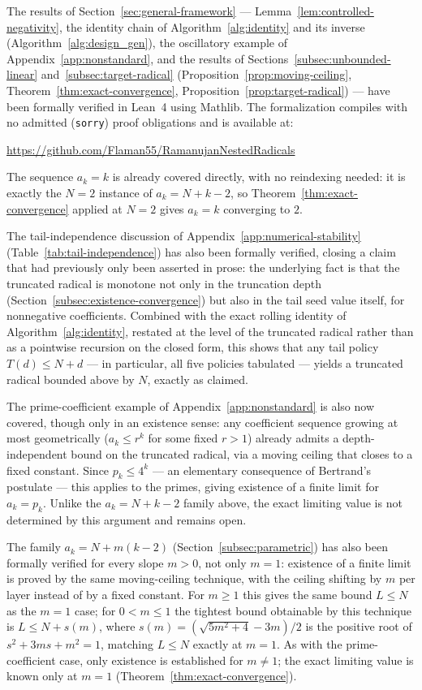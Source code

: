 \documentclass[11pt,a4paper]{amsart}
\theoremstyle{plain}
\theoremstyle{definition}
\theoremstyle{remark}
\begin{document}
The results of Section~\ref{sec:general-framework} — Lemma~\ref{lem:controlled-negativity}, the identity chain of Algorithm~\ref{alg:identity} and its inverse (Algorithm~\ref{alg:design_gen}), the oscillatory example of Appendix~\ref{app:nonstandard}, and the results of Sections~\ref{subsec:unbounded-linear} and~\ref{subsec:target-radical} (Proposition~\ref{prop:moving-ceiling}, Theorem~\ref{thm:exact-convergence}, Proposition~\ref{prop:target-radical}) — have been formally verified in Lean~4 using Mathlib. The formalization compiles with no admitted (\texttt{sorry}) proof obligations and is available at:
\begin{center}
\url{https://github.com/Flaman55/RamanujanNestedRadicals}
\end{center}
The sequence $a_k=k$ is already covered directly, with no reindexing needed: it is exactly the $N=2$ instance of $a_k=N+k-2$, so Theorem~\ref{thm:exact-convergence} applied at $N=2$ gives $a_k=k$ converging to $2$.

The tail-independence discussion of Appendix~\ref{app:numerical-stability} (Table~\ref{tab:tail-independence}) has also been formally verified, closing a claim that had previously only been asserted in prose: the underlying fact is that the truncated radical is monotone not only in the truncation depth (Section~\ref{subsec:existence-convergence}) but also in the tail seed value itself, for nonnegative coefficients. Combined with the exact rolling identity of Algorithm~\ref{alg:identity}, restated at the level of the truncated radical rather than as a pointwise recursion on the closed form, this shows that any tail policy $T(d) \le N+d$ — in particular, all five policies tabulated — yields a truncated radical bounded above by $N$, exactly as claimed.

The prime-coefficient example of Appendix~\ref{app:nonstandard} is also now covered, though only in an existence sense: any coefficient sequence growing at most geometrically ($a_k \le r^k$ for some fixed $r>1$) already admits a depth-independent bound on the truncated radical, via a moving ceiling that closes to a fixed constant. Since $p_k \le 4^k$ — an elementary consequence of Bertrand's postulate — this applies to the primes, giving existence of a finite limit for $a_k=p_k$. Unlike the $a_k=N+k-2$ family above, the exact limiting value is not determined by this argument and remains open.

The family $a_k=N+m(k-2)$ (Section~\ref{subsec:parametric}) has also been formally verified for every slope $m>0$, not only $m=1$: existence of a finite limit is proved by the same moving-ceiling technique, with the ceiling shifting by $m$ per layer instead of by a fixed constant. For $m \ge 1$ this gives the same bound $L\le N$ as the $m=1$ case; for $0<m\le 1$ the tightest bound obtainable by this technique is $L \le N+s(m)$, where $s(m)=(\sqrt{5m^2+4}-3m)/2$ is the positive root of $s^2+3ms+m^2=1$, matching $L\le N$ exactly at $m=1$. As with the prime-coefficient case, only existence is established for $m\ne 1$; the exact limiting value is known only at $m=1$ (Theorem~\ref{thm:exact-convergence}).
\end{document}
